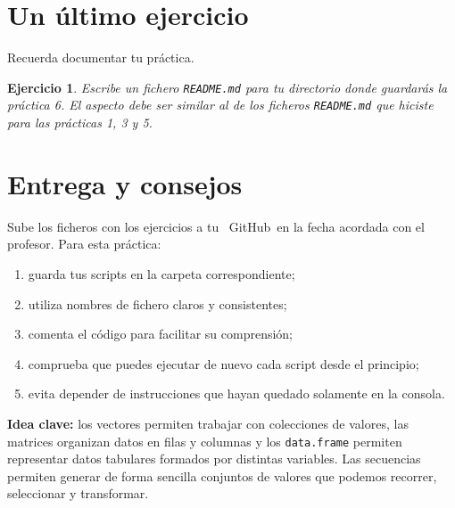 \documentclass[11pt,a4paper]{article}
\newcommand{\GitHub}{\faIcon{github}~\!GitHub}
\theoremstyle{exercise}
\newtheorem{exercise}{Ejercicio}
\begin{document}
\section{Un último ejercicio}


Recuerda documentar tu práctica.

\begin{exercise} Escribe un fichero \texttt{README.md} para tu directorio donde guardarás la práctica 6. El aspecto debe ser similar al de los ficheros \texttt{README.md} que hiciste para las prácticas 1, 3 y 5. 
\end{exercise}


\section{Entrega y consejos}

Sube los ficheros con los ejercicios a tu \GitHub\ en la fecha acordada con el profesor. Para esta práctica:
\begin{enumerate}
\item guarda tus scripts en la carpeta correspondiente;
\item utiliza nombres de fichero claros y consistentes;
\item comenta el código para facilitar su comprensión;
\item comprueba que puedes ejecutar de nuevo cada script desde el principio;
\item evita depender de instrucciones que hayan quedado solamente en la consola.
\end{enumerate}

\begin{center}
\textbf{\color{azuluc}Idea clave:} los vectores permiten trabajar con colecciones de valores, las matrices organizan datos en filas y columnas y los \texttt{data.frame} permiten representar datos tabulares formados por distintas variables. Las secuencias permiten generar de forma sencilla conjuntos de valores que podemos recorrer, seleccionar y transformar.
\end{center}
\end{document}

